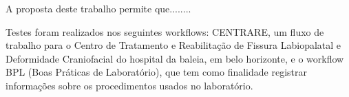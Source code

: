 A proposta deste trabalho permite que........

Testes foram realizados nos seguintes workflows: CENTRARE, um fluxo de trabalho para o Centro de Tratamento e Reabilitação de Fissura Labiopalatal e Deformidade Craniofacial do hospital da baleia, em belo horizonte, e o workflow BPL (Boas Práticas de Laboratório), que tem como finalidade registrar informações sobre os procedimentos usados no laboratório.